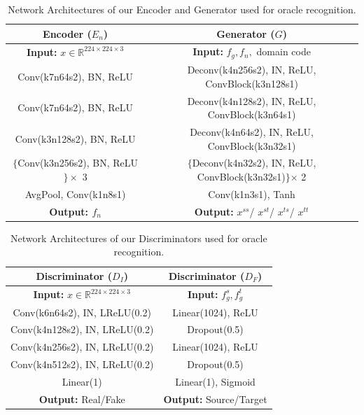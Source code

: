 \documentclass[10pt,journal,compsoc,twocolumn ]{IEEEtran}
\begin{document}
\begin{table}
\renewcommand\arraystretch{1.2}
\caption{Network Architectures of our Encoder and Generator used for oracle recognition. }
\label{archi_detail}
	\begin{center}
    \small
	\begin{tabular}{c|c}
		\hline
          Encoder ($E_n$) & Generator ($G$)  \\ \hline
          \textbf{Input:} $x\in \mathbb{R}^{224\times 224\times 3}$ & \textbf{Input:} $f_g, f_n,$ domain code  \\ \hline\hline
          Conv(k7n64s2), BN, ReLU & Deconv(k4n256s2), IN, ReLU, ConvBlock(k3n128s1)  \\
          Conv(k7n64s2), BN, ReLU & Deconv(k4n128s2), IN, ReLU, ConvBlock(k3n64s1)  \\
          Conv(k3n128s2), BN, ReLU & Deconv(k4n64s2), IN, ReLU, ConvBlock(k3n32s1)\\
          $\{$Conv(k3n256s2), BN, ReLU$\}\times$ 3 & $\{$Deconv(k4n32s2), IN, ReLU, ConvBlock(k3n32s1)$\}$$\times$ 2 \\\hline
          AvgPool, Conv(k1n8s1) & Conv(k1n3s1), Tanh \\ \hline\hline
          \textbf{Output: $f_n$ } & \textbf{Output:} $x^{ss}$/ $x^{st}$/ $x^{ts}$/ $x^{tt}$ \\ \hline
	\end{tabular}
    \end{center}
\end{table}

\begin{table}
\renewcommand\arraystretch{1.2}
\caption{Network Architectures of our Discriminators used for oracle recognition. }
\label{archi_detail2}
	\begin{center}
    \small
	\begin{tabular}{c|c}
		\hline
          Discriminator ($D_I$) & Discriminator ($D_F$) \\ \hline
          \textbf{Input:} $x\in \mathbb{R}^{224\times 224\times 3}$ & \textbf{Input:} $f_g^s, f_g^t$ \\ \hline\hline
          Conv(k6n64s2), IN, LReLU(0.2) &Linear(1024), ReLU \\
          Conv(k4n128s2), IN, LReLU(0.2) & Dropout(0.5) \\
          Conv(k4n256s2), IN, LReLU(0.2) & Linear(1024), ReLU\\
           Conv(k4n512s2), IN, LReLU(0.2) & Dropout(0.5)\\\hline
           Linear(1) & Linear(1), Sigmoid \\ \hline\hline
           \textbf{Output:} Real/Fake & \textbf{Output:} Source/Target\\ \hline
	\end{tabular}
    \end{center}
\end{table}
\end{document}
